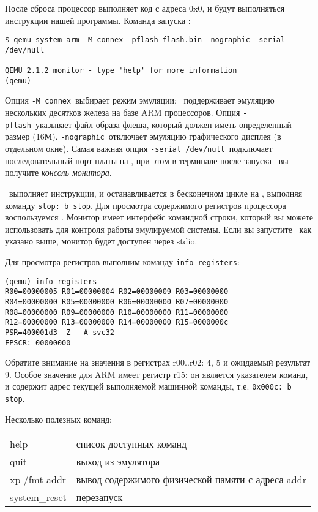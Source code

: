 После сброса процессор выполняет код с адреса 0x0, и будут выполняться
инструкции нашей программы. Команда запуска \qemu:

\begin{verbatim}
$ qemu-system-arm -M connex -pflash flash.bin -nographic -serial /dev/null

QEMU 2.1.2 monitor - type 'help' for more information
(qemu) 
\end{verbatim}

Опция \verb|-M connex|\ выбирает режим эмуляции: \qemu\ поддерживает эмуляцию
нескольких десятков железа на базе ARM процессоров. Опция \verb|-pflash|\
указывает файл образа флеша, который должен иметь определенный размер (16М).
\verb|-nographic|\ отключает эмуляцию графического дисплея (в отдельном окне).
Самая важная опция \verb|-serial /dev/null|\ подключает последовательный порт
платы на \file{/dev/null}, при этом в терминале после запуска \qemu\ вы получите
\emph{консоль монитора}.

\qemu\ выполняет инструкции, и останавливается в бесконечном цикле на
\var{stop}, выполняя команду \verb|stop: b stop|. Для просмотра содержимого
регистров процессора воспользуемся \termdef{монитором}{монитор \qemu}.
Монитор имеет интерфейс командной строки, который вы можете использовать для
контроля работы эмулируемой системы. Если вы запустите \qemu\ как указано выше,
монитор будет доступен через stdio.

Для просмотра регистров выполним команду \verb|info registers|:

\begin{verbatim}
(qemu) info registers
R00=00000005 R01=00000004 R02=00000009 R03=00000000
R04=00000000 R05=00000000 R06=00000000 R07=00000000
R08=00000000 R09=00000000 R10=00000000 R11=00000000
R12=00000000 R13=00000000 R14=00000000 R15=0000000c
PSR=400001d3 -Z-- A svc32
FPSCR: 00000000
\end{verbatim}

Обратите внимание на значения в регистрах r00..r02: 4, 5 и ожидаемый результат
9. Особое значение для ARM имеет регистр r15: он является указателем команд, и
содержит адрес текущей выполняемой машинной команды, т.е. \verb|0x000c: b stop|.


Несколько полезных команд:

\begin{tabular}{l l}
help & список доступных команд \\
quit & выход из эмулятора \\
xp /fmt addr & вывод содержимого физической памяти с адреса addr \\
system\_reset & перезапуск \\
\end{tabular}
\bigskip

